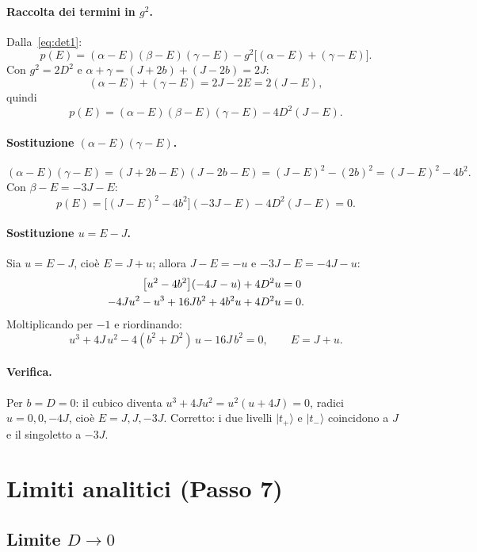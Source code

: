 \documentclass[11pt,a4paper]{article}
\newcommand{\ket}[1]{\lvert #1 \rangle}
\theoremstyle{definition}
\begin{document}
\paragraph{Raccolta dei termini in $g^2$.} Dalla~\eqref{eq:det1}:
\[
p(E)=(\alpha-E)(\beta-E)(\gamma-E)-g^2\bigl[(\alpha-E)+(\gamma-E)\bigr].
\]
Con $g^2=2D^2$ e $\alpha+\gamma=(J+2b)+(J-2b)=2J$:
\[
(\alpha-E)+(\gamma-E)=2J-2E=2(J-E),
\]
quindi
\[
p(E)=(\alpha-E)(\beta-E)(\gamma-E)-4D^2(J-E).
\]

\paragraph{Sostituzione $(\alpha-E)(\gamma-E)$.}
\[
(\alpha-E)(\gamma-E)=(J+2b-E)(J-2b-E)=(J-E)^2-(2b)^2=(J-E)^2-4b^2.
\]
Con $\beta-E=-3J-E$:
\[
p(E)=\bigl[(J-E)^2-4b^2\bigr](-3J-E)-4D^2(J-E)=0.
\]

\paragraph{Sostituzione $u=E-J$.} Sia $u=E-J$, cioè $E=J+u$; allora $J-E=-u$ e $-3J-E=-4J-u$:
\begin{align}
\bigl[u^2-4b^2\bigr](-4J-u)+4D^2 u&=0\notag\\
-4Ju^2-u^3+16Jb^2+4b^2u+4D^2u&=0.
\end{align}
Moltiplicando per $-1$ e riordinando:
\begin{equation}
\boxed{u^3+4J\,u^2-4(b^2+D^2)\,u-16J\,b^2=0,\qquad E=J+u.}
\label{eq:cubic}
\end{equation}

\paragraph{Verifica.} Per $b=D=0$: il cubico diventa $u^3+4Ju^2=u^2(u+4J)=0$, radici $u=0,0,-4J$, cioè
$E=J,J,-3J$. Corretto: i due livelli $\ket{t_+}$ e $\ket{t_-}$ coincidono a $J$ e il singoletto a $-3J$.

\FloatBarrier
\section{Limiti analitici (Passo 7)}

\subsection{Limite $D\to0$}
\end{document}
